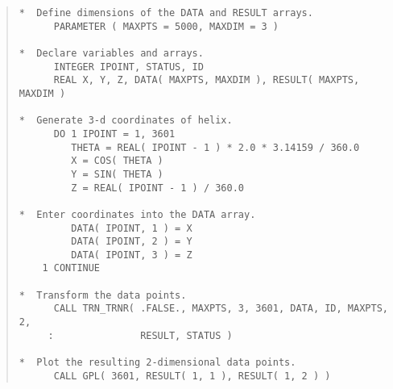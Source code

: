 \documentclass[twoside,11pt]{article}
\newcommand{\numcir}[1]{\mbox{\hspace{3ex}\fbox{#1}}}
\begin{document}
\begin{quote}
\begin{tabbing} %

\verb#*  Define dimensions of the DATA and RESULT arrays.    #\\
\verb#      PARAMETER ( MAXPTS = 5000, MAXDIM = 3 )          #\\
\verb#                                                       #\\
\verb#*  Declare variables and arrays.                       #\\
\verb#      INTEGER IPOINT, STATUS, ID                       #\\
\verb#      REAL X, Y, Z, DATA( MAXPTS, MAXDIM ), RESULT( MAXPTS, MAXDIM )#\\
\verb#                                                       #\\
\verb#*  Generate 3-d coordinates of helix.                  #\\
\verb#      DO 1 IPOINT = 1, 3601                            #\\
\verb#         THETA = REAL( IPOINT - 1 ) * 2.0 * 3.14159 / 360.0#\\
\verb#         X = COS( THETA )                              #\numcir{1}\\
\verb#         Y = SIN( THETA )                              #\\
\verb#         Z = REAL( IPOINT - 1 ) / 360.0                #\\
\verb#                                                       #\\
\verb#*  Enter coordinates into the DATA array.              #\\
\verb#         DATA( IPOINT, 1 ) = X                         #\numcir{2}\\
\verb#         DATA( IPOINT, 2 ) = Y                         #\\
\verb#         DATA( IPOINT, 3 ) = Z                         #\\
\verb#    1 CONTINUE                                         #\\
\verb#                                                       #\\
\verb#*  Transform the data points.                          #\\
\verb#      CALL TRN_TRNR( .FALSE., MAXPTS, 3, 3601, DATA, ID, MAXPTS, 2,#\\
\verb#     :               RESULT, STATUS )                  #\numcir{3}\\
\verb#                                                       #\\
\verb#*  Plot the resulting 2-dimensional data points.       #\\
\verb#      CALL GPL( 3601, RESULT( 1, 1 ), RESULT( 1, 2 ) ) #\numcir{4}

\end{tabbing}
\end{quote}
\end{document}
